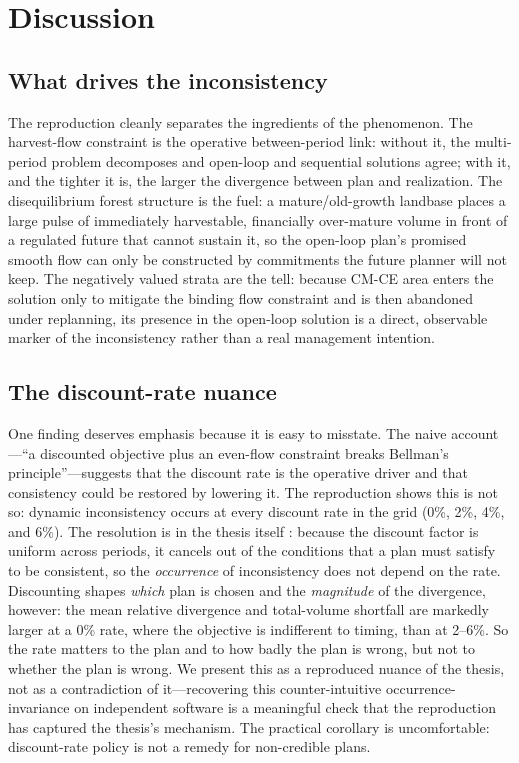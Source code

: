 \documentclass[12pt]{article}
\begin{document}
\section{Discussion}

\hypertarget{what-drives-the-inconsistency}{%
\subsection{What drives the inconsistency}\label{what-drives-the-inconsistency}}

The reproduction cleanly separates the ingredients of the phenomenon. The harvest-flow constraint is the operative between-period link: without it, the multi-period problem decomposes and open-loop and sequential solutions agree; with it, and the tighter it is, the larger the divergence between plan and realization. The disequilibrium forest structure is the fuel: a mature/old-growth landbase places a large pulse of immediately harvestable, financially over-mature volume in front of a regulated future that cannot sustain it, so the open-loop plan's promised smooth flow can only be constructed by commitments the future planner will not keep. The negatively valued strata are the tell: because CM-CE area enters the solution only to mitigate the binding flow constraint and is then abandoned under replanning, its presence in the open-loop solution is a direct, observable marker of the inconsistency rather than a real management intention.

\hypertarget{the-discount-rate-nuance}{%
\subsection{The discount-rate nuance}\label{the-discount-rate-nuance}}

One finding deserves emphasis because it is easy to misstate. The naive account---``a discounted objective plus an even-flow constraint breaks Bellman's principle''---suggests that the discount rate is the operative driver and that consistency could be restored by lowering it. The reproduction shows this is not so: dynamic inconsistency occurs at every discount rate in the grid (0\%, 2\%, 4\%, and 6\%). The resolution is in the thesis itself \citep[ch.~3, p.~58--59]{daugherty1991credibility}: because the discount factor is uniform across periods, it cancels out of the conditions that a plan must satisfy to be consistent, so the \emph{occurrence} of inconsistency does not depend on the rate. Discounting shapes \emph{which} plan is chosen and the \emph{magnitude} of the divergence, however: the mean relative divergence and total-volume shortfall are markedly larger at a 0\% rate, where the objective is indifferent to timing, than at 2--6\%. So the rate matters to the plan and to how badly the plan is wrong, but not to whether the plan is wrong. We present this as a reproduced nuance of the thesis, not as a contradiction of it---recovering this counter-intuitive occurrence-invariance on independent software is a meaningful check that the reproduction has captured the thesis's mechanism. The practical corollary is uncomfortable: discount-rate policy is not a remedy for non-credible plans.
\end{document}
